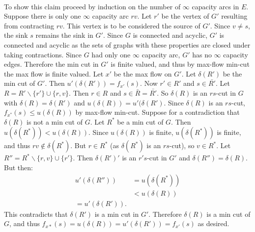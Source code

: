 \documentclass[letterpaper,12pt,oneside,onecolumn]{article}
\begin{document}
\paragraph{}
To show this claim proceed by induction on the number of $\infty$ capacity arcs in $E$. Suppose there is only one $\infty$ capacity arc $rv$. Let $r'$ be the vertex of $G'$ resulting from contracting $rv$. This vertex is to be considered the source of $G'$. Since $v\neq s$, the sink $s$ remains the sink in $G'$. Since $G$ is connected and acyclic, $G'$ is connected and acyclic as the sets of graphs with these properties are closed under taking contractions. Since $G$ had only one $\infty$ capacity arc, $G'$ has no $\infty$ capacity edges. Therefore the min cut in $G'$ is finite valued, and thus by max-flow min-cut the max flow is finite valued. Let $x'$ be the max flow on $G'$. Let $\delta(R')$ be the min cut of $G'$. Then $u'(\delta(R')) = f_{x'}(s)$. Now $r' \in R'$ and $s \in \bar{R'}$. Let $R = R' \backslash\{r'\} \cup \{r,v\}$. Then $r \in R$ and $s \in \bar{R} = \bar{R'}$. So $\delta(R)$ is an $rs$-cut in $G$ with $\delta(R) = \delta(R')$ and $u(\delta(R)) = u'(\delta(R')$. Since $\delta(R)$ is an $rs$-cut, $f_{x^*}(s) \leq u(\delta(R))$ by max-flow min-cut. Suppose for a contradiction that $\delta(R)$ is not a min cut of $G$. Let $R^*$ be a min cut of $G$. Then $u(\delta(R^*)) < u(\delta(R))$. Since $u(\delta(R))$ is finite, $u(\delta(R^*))$ is finite, and thus $rv \not\in \delta(R^*)$. But $r \in R^*$ (as $\delta(R^*)$ is an $rs$-cut), so $v \in R^*$. Let $R'' = R^* \backslash \{r,v\} \cup \{r'\}$. Then $\delta(R')'$ is an $r's$-cut in $G'$ and $\delta(R'') = \delta(R)$. But then:
\begin{align*}
u'(\delta(R'')) &= u(\delta(R^*)) \\
&< u(\delta(R)) \\
= u'(\delta(R')).
\end{align*}
This contradicts that $\delta(R')$ is a min cut in $G'$. Therefore $\delta(R)$ is a min cut of $G$, and thus $f_{x*}(s) = u(\delta(R)) = u'(\delta(R')) = f_{x'}(s)$ as desired.
\end{document}
